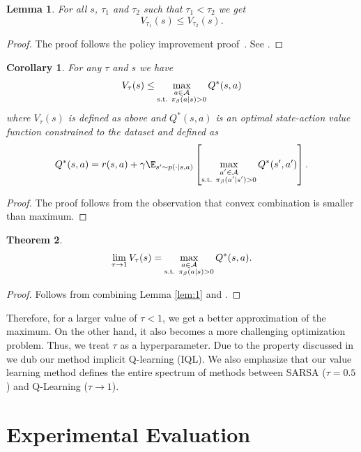 \documentclass{article} %
\newtheorem{theorem}{Theorem}
\newtheorem{lemma}[theorem]{Lemma}
\newtheorem{corollary}{Corollary}[theorem]
\def\ourname{IQL\xspace}
\begin{document}
\begin{lemma}
\label{lem:2}
For all $s$, $\tau_1$ and $\tau_2$ such that $\tau_1 < \tau_2$ we get
$$
V_{\tau_1}(s) \le V_{\tau_2} (s).
$$
\end{lemma}
\begin{proof}
The proof follows the policy improvement proof~\citep{sutton2018reinforcement}. See .
\end{proof}

\label{sec:iql}
\begin{corollary}
For any $\tau$ and $s$ we have
$$
V_\tau(s)\le\max_{\substack{a\in \mathcal{A} \\\text{s.t. }\pi_\beta(a|s) > 0}}Q^*(s,a)
$$
where $V_\tau(s)$ is defined as above and $Q^*(s,a)$ is an optimal state-action value function constrained to the dataset and defined as
$$
Q^*(s, a) = r(s,a) + \gamma \E_{s'\sim p(\cdot|s,a)}\left[\max_{\substack{a'\in \A \\\text{s.t. }\pi_\beta(a'|s') > 0}}Q^*(s',a')\right].
$$
\label{theorem:cor}
\end{corollary}
\begin{proof}
The proof follows from the observation that convex combination is smaller than maximum.
\end{proof}
\begin{theorem}
\label{theorem:iql}
$$
\lim_{\tau \rightarrow 1} V_\tau(s) = \max_{\substack{a\in \mathcal{A} \\\text{s.t. }\pi_\beta(a|s) > 0}}Q^*(s,a).
$$
\end{theorem}
\begin{proof}
Follows from combining Lemma \ref{lem:1} and  .
\end{proof}
Therefore, for a larger value of $\tau < 1$, we get a better approximation of the maximum. On the other hand, it also becomes a more challenging optimization problem. Thus, we treat $\tau$ as a hyperparameter.
Due to the property discussed in  we dub our method implicit Q-learning (\ourname). We also emphasize that our value learning method defines the entire spectrum of methods between SARSA ($\tau=0.5$) and Q-Learning ($\tau \rightarrow 1$).


\section{Experimental Evaluation}
\end{document}

